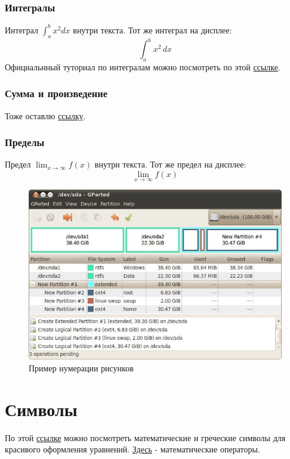     \subsubsection{Интегралы}
    Интеграл \(\int_{a}^{b} x^2 dx\) внутри текста.
    \medskip
    Тот же интеграл на дисплее:
    \[
    \int_{a}^{b} x^2 \,dx
    \]
    Официальнный туториал по интегралам можно посмотреть по этой  \href{https://www.overleaf.com/learn/latex/Integrals,_sums_and_limits#Integrals}{ссылке}.

    \subsubsection{Сумма и произведение}
    Тоже оставлю \href{https://www.overleaf.com/learn/latex/Integrals,_sums_and_limits#Sums_and_products}{ссылку}.
    
    \subsubsection{Пределы}
    
    Предел \(\lim_{x\to\infty} f(x)\) внутри текста.
    Тот же предел на дисплее:
    \[
    \lim_{x\to\infty} f(x)
    \]
\begin{figure}[!htb]
	\centering
	\includegraphics[width=\textwidth]{Images/image2.jpg}
	\caption{Пример нумерации рисунков}
	\label{fig:image2}
\end{figure}

\section{Символы}
По этой   \href{https://www.overleaf.com/learn/latex/List_of_Greek_letters_and_math_symbols}{ссылке} можно посмотреть математические и греческие символы для красивого оформления уравнений. \href{https://www.overleaf.com/learn/latex/Operators}{Здесь} - математические операторы.


